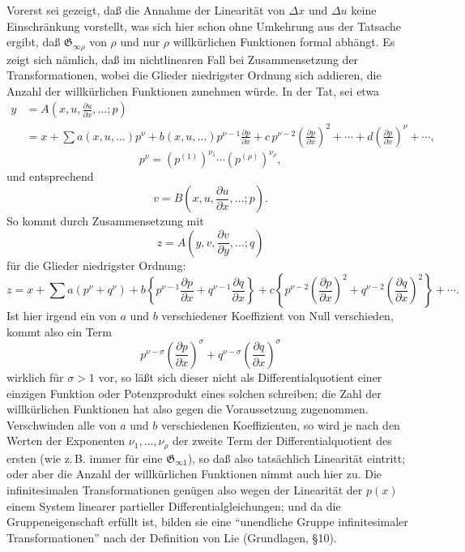 \documentclass[11pt]{article}
\newcommand{\G}{\mathfrak G}
\newcommand{\D}{\Delta}
\newcommand{\p}{\partial}
\begin{document}
Vorerst sei gezeigt, daß die Annahme der Linearität von \(\D x\) und \(\D u\) keine Einschränkung vorstellt, was sich hier schon ohne Umkehrung aus der Tatsache ergibt, daß \(\G_{\infty\rho}\) von \(\rho\) und nur \(\rho\) willkürlichen Funktionen formal abhängt. Es zeigt sich nämlich, daß im nichtlinearen Fall bei Zusammensetzung der Transformationen, wobei die Glieder niedrigster Ordnung sich addieren, die Anzahl der willkürlichen Funktionen zunehmen würde. In der Tat, sei etwa
\[
\begin{aligned}
y&=A\!\left(x,u,\frac{\p u}{\p x},\ldots;p\right)\\
&=x+\sum a(x,u,\ldots)p^\nu
+b(x,u,\ldots)p^{\nu-1}\frac{\p p}{\p x}
+c\,p^{\nu-2}\left(\frac{\p p}{\p x}\right)^2+\cdots
+d\left(\frac{\p p}{\p x}\right)^\nu+\cdots,
\end{aligned}
\]
\[
p^\nu=(p^{(1)})^{\nu_1}\cdots(p^{(\rho)})^{\nu_\rho},
\]
und entsprechend
\[
v=B\!\left(x,u,\frac{\p u}{\p x},\ldots;p\right).
\]
So kommt durch Zusammensetzung mit
\[
z=A\!\left(y,v,\frac{\p v}{\p y},\ldots;q\right)
\]
für die Glieder niedrigster Ordnung:
\[
z=x+\sum a(p^\nu+q^\nu)+
b\left\{p^{\nu-1}\frac{\p p}{\p x}+q^{\nu-1}\frac{\p q}{\p x}\right\}
+c\left\{p^{\nu-2}\left(\frac{\p p}{\p x}\right)^2
+q^{\nu-2}\left(\frac{\p q}{\p x}\right)^2\right\}+\cdots.
\]
Ist hier irgend ein von \(a\) und \(b\) verschiedener Koeffizient von Null verschieden, kommt also ein Term
\[
p^{\nu-\sigma}\left(\frac{\p p}{\p x}\right)^\sigma
+q^{\nu-\sigma}\left(\frac{\p q}{\p x}\right)^\sigma
\]
wirklich für \(\sigma>1\) vor, so läßt sich dieser nicht als Differentialquotient einer einzigen Funktion oder Potenzprodukt eines solchen schreiben; die Zahl der willkürlichen Funktionen hat also gegen die Voraussetzung zugenommen. Verschwinden alle von \(a\) und \(b\) verschiedenen Koeffizienten, so wird je nach den Werten der Exponenten \(\nu_1,\ldots,\nu_\rho\) der zweite Term der Differentialquotient des ersten (wie z.\,B. immer für eine \(\G_{\infty1}\)), so daß also tatsächlich Linearität eintritt; oder aber die Anzahl der willkürlichen Funktionen nimmt auch hier zu. Die infinitesimalen Transformationen genügen also wegen der Linearität der \(p(x)\) einem System linearer partieller Differentialgleichungen; und da die Gruppeneigenschaft erfüllt ist, bilden sie eine ``unendliche Gruppe infinitesimaler Transformationen'' nach der Definition von Lie (Grundlagen, \S{}10).
\end{document}

